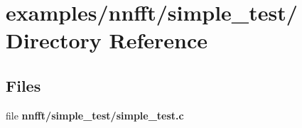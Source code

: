\hypertarget{dir_000033}{
\section{examples/nnfft/simple\_\-test/ Directory Reference}
\label{dir_000033}
}
\subsection*{Files}
\begin{CompactItemize}
\item 
file {\bf nnfft/simple\_\-test/simple\_\-test.c}
\end{CompactItemize}
